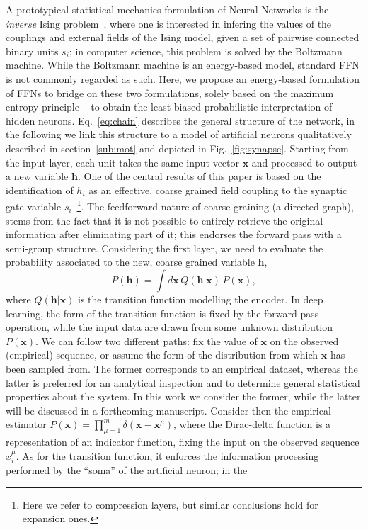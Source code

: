 \documentclass[5p]{elsarticle}
\begin{document}
A prototypical statistical mechanics formulation of Neural Networks is the {\it inverse} Ising problem~\cite{zecchina}, where one is interested in infering the values of the couplings and external fields of the Ising model, given a set of pairwise connected binary units $s_i$; in computer science, this problem is solved by the Boltzmann machine. While the Boltzmann machine is an energy-based model, standard FFN is not commonly regarded as such. Here, we propose an energy-based formulation of FFNs to bridge on these two formulations, solely based on the maximum entropy principle ~\cite{zecchina, roberto, mckay, jaynes} to obtain the least biased probabilistic interpretation of hidden neurons. Eq.~\eqref{eq:chain} describes the general structure of the network, in the following we link this structure to a model of artificial neurons qualitatively described in section~\eqref{sub:mot} and depicted in Fig.~\eqref{fig:synapse}. Starting from the input layer, each unit takes the same input vector $\mathbf{x}$ and processed to output a new variable $\mathbf{h}$.
	One of the central results of this paper is based on the identification of $h_i$ as an effective, coarse grained field coupling to the synaptic gate variable $s_i$~\footnote{ Here we refer to compression layers, but similar conclusions hold for expansion ones.}. The feedforward nature of coarse graining (a directed graph), stems from the fact that it is not possible to entirely retrieve the original information after eliminating part of it; this endorses the forward pass with a semi-group structure. Considering the first layer, we need to evaluate the probability associated to the new, coarse grained variable $\mathbf{h}$,
%
\begin{equation} \label{eq:ps1}
P(\mathbf{h}) =  \int d \mathbf{x} \, Q(\mathbf{h} | \mathbf{x} ) \, P(\mathbf{x}),
\end{equation}
%
where  $Q(\mathbf{h} | \mathbf{x} )$ is the transition function modelling the encoder. In deep learning, the form of the transition function is fixed by the forward pass operation, while the  input data are drawn from some unknown distribution $P(\mathbf{x})$. We can follow two different paths: fix the value of $\mathbf{x}$ on the observed (empirical) sequence, or assume the form of the distribution from which $\mathbf{x}$ has been sampled from. The former corresponds to an empirical dataset, whereas the latter is preferred for an analytical inspection and to determine general statistical properties about the system. In this work we consider the former, while the latter will be discussed in a forthcoming manuscript. Consider then the empirical estimator $P(\mathbf{x}) =  \prod_{\mu=1}^m  \delta( \mathbf{x} - \mathbf{x}^{\mu} )$, where the Dirac-delta function is a representation of an indicator function, fixing the input on the observed sequence $x_i^{\mu}$. As for the transition function, it enforces the information processing performed by the ``soma'' of the artificial neuron; in the
\end{document}

